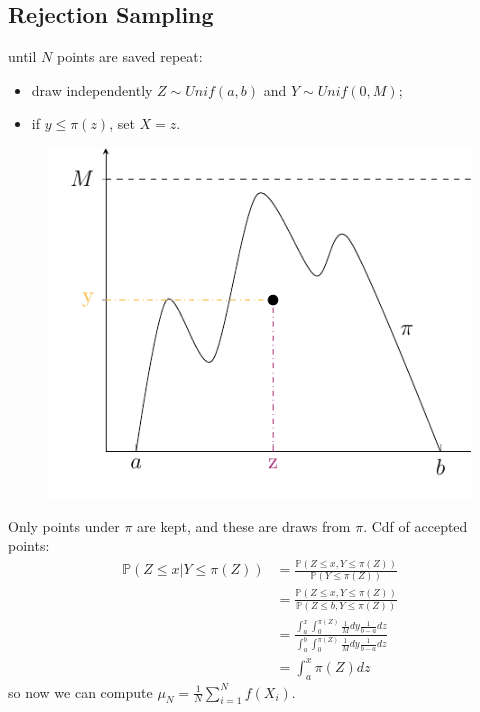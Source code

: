 \documentclass{article}
\begin{document}
\subsection{Rejection Sampling}
\begin{algorithm}
    until $N$ points are saved repeat:
    \begin{itemize}
        \item draw independently $Z \sim Unif (a,b)$ and $ Y \sim Unif(0,M) $;
        \item if $y \leq \pi(z)$, set $X=z$.
    \end{itemize}
\end{algorithm}
\begin{figure}[H]
\centering
\includegraphics{standalones/pdfs/rejection1}
    \label{rejsampl}
\end{figure}
Only points under $\pi $ are kept, and these are draws from $\pi$. Cdf of accepted points:
\begin{equation*}
\begin{split}
    \mathbb{P}(Z \leq x| Y \leq \pi(Z))&= \frac{\mathbb{P}(Z \leq x, Y \leq \pi(Z))}{\mathbb{P}( Y \leq \pi(Z))}\\
    &= \frac{\mathbb{P}(Z \leq x, Y \leq \pi(Z))}{\mathbb{P}( Z \leq b, Y \leq \pi(Z))}\\
    &= \frac{\int_a^x \int_0 ^{\pi(Z)}\frac{1}{M}dy \frac{1}{b-a}dz} {\int_a^b \int_0 ^{\pi(Z)}\frac{1}{M}dy \frac{1}{b-a}dz}\\
    &= \int_a^x \pi(Z) dz
\end{split}
\end{equation*}
so now we can compute  $\mu_N = \frac{1}{N} \sum_{i=1}^N f(X_i) $. 
\end{document}
